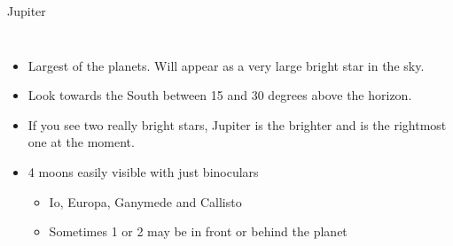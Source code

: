 \documentclass[pdf, ]{beamer}
\begin{document}
\begin{frame}{Jupiter}
\begin{columns}
		\begin{itemize}
			\item Largest of the planets. Will appear as a very large bright star in the sky.
			\item Look towards the South between 15 and 30 degrees above the horizon.
			\item If you see two really bright stars, Jupiter is the brighter and is the rightmost one at the moment.
			\item 4 moons easily visible with just binoculars
				\begin{itemize}
					\item Io, Europa, Ganymede and Callisto
					\item Sometimes 1 or 2 may be in front or behind the planet
				\end{itemize}
		\end{itemize}
	\end{columns}
\end{frame}
\end{document}
